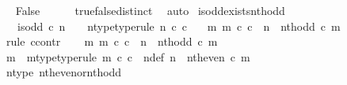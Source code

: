 \begin{isabellebody}
\ \isamarkupfalse%
\ False\isanewline
\ \ \ \ \isamarkupfalse%
\ true{\isacharunderscore}{\kern0pt}false{\isacharunderscore}{\kern0pt}distinct\ \isamarkupfalse%
\ auto\isanewline
{}\isamarkupfalse%
%
\endisatagproof
{\isafoldproof}%
%
\isadelimproof
\isanewline
%
\endisadelimproof
\isanewline
{}\isamarkupfalse%
\ is{\isacharunderscore}{\kern0pt}odd{\isacharunderscore}{\kern0pt}exists{\isacharunderscore}{\kern0pt}nth{\isacharunderscore}{\kern0pt}odd{\isacharcolon}{\kern0pt}\isanewline
\ \ \ {\isachardoublequoteopen}is{\isacharunderscore}{\kern0pt}odd\ {\isasymcirc}\isactrlsub c\ n\ {\isacharequal}{\kern0pt}\ {\isasymt}{\isachardoublequoteclose}\ \ n{\isacharunderscore}{\kern0pt}type{\isacharbrackleft}{\kern0pt}type{\isacharunderscore}{\kern0pt}rule{\isacharbrackright}{\kern0pt}{\isacharcolon}{\kern0pt}\ {\isachardoublequoteopen}n\ {\isasymin}\isactrlsub c\ {\isasymnat}\isactrlsub c{\isachardoublequoteclose}\isanewline
\ \ \ {\isachardoublequoteopen}{\isasymexists}m{\isachardot}{\kern0pt}\ m\ {\isasymin}\isactrlsub c\ {\isasymnat}\isactrlsub c\ {\isasymand}\ n\ {\isacharequal}{\kern0pt}\ nth{\isacharunderscore}{\kern0pt}odd\ {\isasymcirc}\isactrlsub c\ m{\isachardoublequoteclose}\isanewline
%
\isadelimproof
%
\endisadelimproof
%
\isatagproof
{}\isamarkupfalse%
\ {\isacharparenleft}{\kern0pt}rule\ ccontr{\isacharparenright}{\kern0pt}\isanewline
\ \ \isamarkupfalse%
\ {\isachardoublequoteopen}{\isasymnexists}m{\isachardot}{\kern0pt}\ m\ {\isasymin}\isactrlsub c\ {\isasymnat}\isactrlsub c\ {\isasymand}\ n\ {\isacharequal}{\kern0pt}\ nth{\isacharunderscore}{\kern0pt}odd\ {\isasymcirc}\isactrlsub c\ m{\isachardoublequoteclose}\isanewline
\ \ \isamarkupfalse%
\ \isamarkupfalse%
\ m\ \ m{\isacharunderscore}{\kern0pt}type{\isacharbrackleft}{\kern0pt}type{\isacharunderscore}{\kern0pt}rule{\isacharbrackright}{\kern0pt}{\isacharcolon}{\kern0pt}\ {\isachardoublequoteopen}m\ {\isasymin}\isactrlsub c\ {\isasymnat}\isactrlsub c{\isachardoublequoteclose}\ \ n{\isacharunderscore}{\kern0pt}def{\isacharcolon}{\kern0pt}\ {\isachardoublequoteopen}n\ {\isacharequal}{\kern0pt}\ nth{\isacharunderscore}{\kern0pt}even\ {\isasymcirc}\isactrlsub c\ m{\isachardoublequoteclose}\isanewline
\ \ \ \ \isamarkupfalse%
\ n{\isacharunderscore}{\kern0pt}type\ nth{\isacharunderscore}{\kern0pt}even{\isacharunderscore}{\kern0pt}or{\isacharunderscore}{\kern0pt}nth{\isacharunderscore}{\kern0pt}odd\ \isamarkupfalse%

\end{isabellebody}
